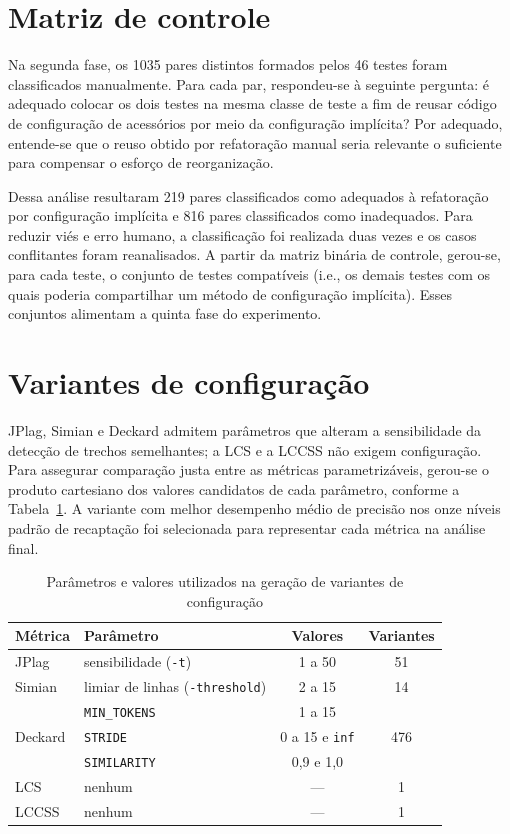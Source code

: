 \section{Matriz de controle}

Na segunda fase, os 1035 pares distintos formados pelos 46 testes foram classificados manualmente. Para cada par, respondeu-se à seguinte pergunta: é adequado colocar os dois testes na mesma classe de teste a fim de reusar código de configuração de acessórios por meio da configuração implícita? Por adequado, entende-se que o reuso obtido por refatoração manual seria relevante o suficiente para compensar o esforço de reorganização.

Dessa análise resultaram 219 pares classificados como adequados à refatoração por configuração implícita e 816 pares classificados como inadequados. Para reduzir viés e erro humano, a classificação foi realizada duas vezes e os casos conflitantes foram reanalisados. A partir da matriz binária de controle, gerou-se, para cada teste, o conjunto de testes compatíveis (i.e., os demais testes com os quais poderia compartilhar um método de configuração implícita). Esses conjuntos alimentam a quinta fase do experimento.

\section{Variantes de configuração}

JPlag, Simian e Deckard admitem parâmetros que alteram a sensibilidade da detecção de trechos semelhantes; a LCS e a LCCSS não exigem configuração. Para assegurar comparação justa entre as métricas parametrizáveis, gerou-se o produto cartesiano dos valores candidatos de cada parâmetro, conforme a Tabela~\ref{table:metric-settings}. A variante com melhor desempenho médio de precisão nos onze níveis padrão de recaptação foi selecionada para representar cada métrica na análise final.

\begin{table}[htb]
	\centering
	\caption{Parâmetros e valores utilizados na geração de variantes de configuração}
	\label{table:metric-settings}
	\small
	\begin{tabular}{llcc}
		\toprule
		Métrica & Parâmetro & Valores & Variantes \\
		\midrule
		JPlag & sensibilidade (\texttt{-t}) & 1 a 50 & 51 \\
		\midrule
		Simian & limiar de linhas (\texttt{-threshold}) & 2 a 15 & 14 \\
		\midrule
		\multirow{3}{*}{Deckard} & \texttt{MIN\_TOKENS} & 1 a 15 & \multirow{3}{*}{476} \\
		                         & \texttt{STRIDE} & 0 a 15 e \texttt{inf} & \\
		                         & \texttt{SIMILARITY} & 0,9 e 1,0 & \\
		\midrule
		LCS & nenhum & --- & 1 \\
		LCCSS & nenhum & --- & 1 \\
		\bottomrule
	\end{tabular}
\end{table}

